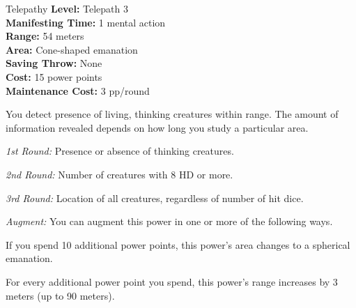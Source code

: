 {Telepathy}
{
	\textbf{Level:}
	Telepath 3\\
	\textbf{Manifesting Time:}
	1 mental action\\
	\textbf{Range:}
	54 meters\\
	\textbf{Area:}
	Cone-shaped emanation\\
	\textbf{Saving Throw:}
	None\\
	\textbf{Cost:}
	15 power points\\
	\textbf{Maintenance Cost:}
	3 pp/round\\
}
{
	You detect presence of living, thinking creatures within range. The amount of information revealed depends on how long you study a particular area.

	\textit{1st Round:}
	Presence or absence of thinking creatures.

	\textit{2nd Round:}
	Number of creatures with 8 HD or more.

	\textit{3rd Round:}
	Location of all creatures, regardless of number of hit dice.

	\textit{Augment:} You can augment this power in one or  more of the following ways.
	\begin{itemize*}
		\item If you spend 10 additional power points, this power's area changes to a spherical emanation.
		\item For every additional power point you spend, this power's range increases by 3 meters (up to 90 meters).
	\end{itemize*}
}
